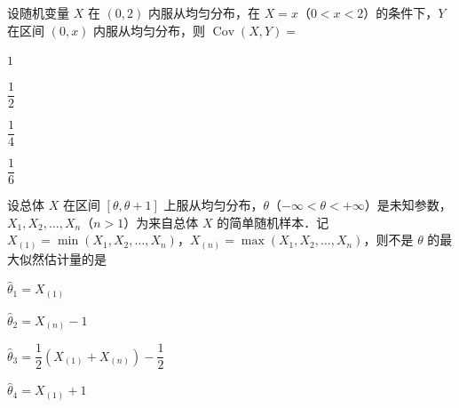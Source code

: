 \begin{question}[index=9]
设随机变量 $X$ 在 $(0,2)$ 内服从均匀分布，在 $X=x$（$0<x<2$）的条件下，$Y$ 在区间 $(0,x)$ 内服从均匀分布，则 $\operatorname{Cov}(X,Y)=$
\begin{choices}[columns=4]
\item $1$
\item $\dfrac12$
\item $\dfrac14$
\item $\dfrac16$
\end{choices}
\end{question}
\QuestionBreak

\begin{question}[index=10]
设总体 $X$ 在区间 $[\theta,\theta+1]$ 上服从均匀分布，$\theta$（$-\infty<\theta<+\infty$）是未知参数，$X_1,X_2,\ldots,X_n$（$n>1$）为来自总体 $X$ 的简单随机样本．记 $X_{(1)}=\min(X_1,X_2,\ldots,X_n)$，$X_{(n)}=\max(X_1,X_2,\ldots,X_n)$，则不是 $\theta$ 的最大似然估计量的是
\begin{choices}[columns=2]
\item $\widehat\theta_1=X_{(1)}$
\item $\widehat\theta_2=X_{(n)}-1$
\item $\widehat\theta_3=\dfrac12(X_{(1)}+X_{(n)})-\dfrac12$
\item $\widehat\theta_4=X_{(1)}+1$
\end{choices}
\end{question}

